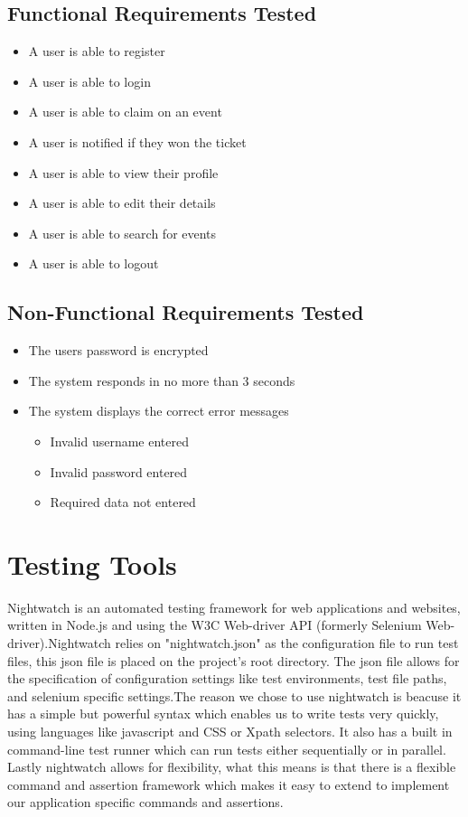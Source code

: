 \documentclass[12pt]{article}
\begin{document}
	\subsection{Functional Requirements Tested}
	\begin{itemize}
		\item A user is able to register
		\item A user is able to login
		\item A user is able to claim on an event
		\item A user is notified if they won the ticket
		\item A user is able to view their profile
		\item A user is able to edit their details
		\item A user is able to search for events
		\item A user is able to logout
	\end{itemize}
	
	\subsection{Non-Functional Requirements Tested}
	\begin{itemize}
		\item The users password is encrypted
		\item The system responds in no more than 3 seconds
		\item The system displays the correct error messages
		\begin{itemize}
			\item Invalid username entered
			\item Invalid password entered
			\item Required data not entered
		\end{itemize}
	\end{itemize}
	
	\section{Testing Tools}
	Nightwatch is an automated testing framework for web applications and websites, written in Node.js and using the W3C Web-driver API (formerly Selenium Web-driver).Nightwatch relies on "nightwatch.json" as the configuration file to run test files, this json file is placed on the project's root directory. The json file allows for the specification of configuration settings like test environments, test file paths, and selenium specific settings.The reason we chose to use nightwatch is beacuse it has a simple but powerful syntax which enables us to write tests very quickly, using languages like javascript and CSS or Xpath selectors. It also has a built in command-line test runner which can run tests either sequentially or in parallel. Lastly nightwatch allows for flexibility, what this means is that there is a flexible command and assertion framework which makes it easy to extend to implement our application specific commands and assertions.
	
\end{document}

